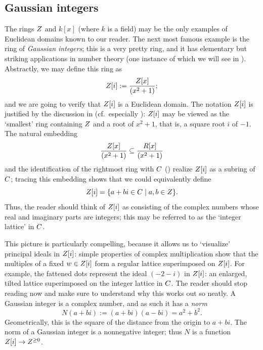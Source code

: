 \subsection{Gaussian integers}
\label{subsec:irred:gaussian-integers}
The rings $Z$ and $k[x]$ (where $k$ is a field) may be the only
examples of Euclidean domains known to our reader. The next most
famous example is the ring of \emph{Gaussian integers}; this is a very
pretty ring, and it has elementary but striking applications in number
theory (one instance of which we will see in
).
Abstractly, we may define this ring as
\[Z[i] := \frac{Z[x]}{(x^2 + 1)};\]
and we are going to verify that $Z[i]$ is a Euclidean domain.  The
notation $Z[i]$ is justified by the discussion in
 (cf.\
especially ): $Z[i]$ may be viewed as the
`smallest' ring containing $Z$ and a root of $x^2 + 1$, that is, a
square root $i$ of $-1$. The natural embedding
\[\frac{Z[x]}{(x^2 + 1)} \subseteq \frac{R[x]}{(x^2 +
    1)}\] and the identification of the rightmost ring with $C$
(\Cref{exam:rings:higher-degree-quotient}) realize $Z[i]$ as a
subring of $C$; tracing this embedding shows that we could
equivalently define
\[Z[i] = \{a + bi \in C \mid a, b \in Z\}.\]
Thus, the reader should think of $Z[i]$ as consisting of the complex
numbers whose real and imaginary parts are integers; this may be
referred to as the `integer lattice' in $C$.

This picture is particularly compelling, because it allows us to
`visualize' principal ideals in $Z[i]$: simple properties of complex
multiplication show that the multiples of a fixed $w \in Z[i]$ form a
regular lattice superimposed on $Z[i]$.  For example, the fattened
dots represent the ideal $(-2 - i)$ in $Z[i]$: an enlarged, tilted
lattice superimposed on the integer lattice in $C$. The reader should
stop reading now and make sure to understand why this works out so
neatly.  A Gaussian integer is a complex number, and as such it has a
\emph{norm}
\[N(a + bi) := (a + bi)(a - bi) = a^2 + b^2.\] Geometrically, this is
the square of the distance from the origin to $a + bi$.  The norm of a
Gaussian integer is a nonnegative integer; thus $N$ is a function
$Z[i] \to Z^{\geq 0}$.


